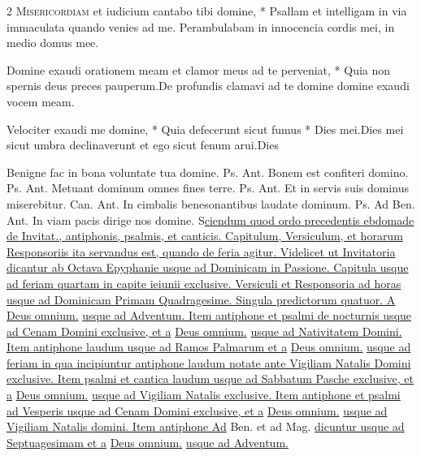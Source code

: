 \begin{multicols*}{2}
\lettrine[lines=2]{\zallmancaps \color{Red} M}{isericordiam} \hypertarget{misericordiam-et-iudicium}{\label{misericordiam-et-iudicium}} et iudicium cantabo tibi domine, * Psallam et intelligam in via immaculata quando venies ad me. \V Perambulabam in innocencia cordis mei, in medio domus mee.
\begin{responsory}
{Domine exaudi orationem meam et clamor meus ad te perveniat, * Quia non spernis deus preces pauperum.}{De profundis clamavi ad te domine domine exaudi vocem meam.}
\end{responsory}%
\begin{responsory-final}
{Velociter exaudi me domine, * Quia defecerunt sicut fumus * Dies mei.}{Dies mei sicut umbra declinaverunt et ego sicut fenum arui.}{Dies}
\end{responsory-final}%
 Benigne fac in bona voluntate tua domine. {\color{Red} Ps.}  {\color{Red} Ant.} Bonem est confiteri domino. {\color{Red} Ps.}  {\color{Red} Ant.} Metuant dominum omnes fines terre. {\color{Red} Ps.}  {\color{Red} Ant.} Et in servis suis dominus miserebitur. {\color{Red} Can.}  {\color{Red} Ant.} In cimbalis benesonantibus laudate dominum. {\color{Red} Ps.}  {\color{Red} Ad Ben. Ant.} In viam pacis dirige nos domine.
\lettrine[lines=2]{\zallmancaps \color{Blue} S}{}\ul{ciendum quod ordo precedentis ebdomade de Invitat., antiphonis, psalmis, et canticis. Capitulum, Versiculum, et horarum Responsoriis ita servandus est, quando de feria agitur. Videlicet ut Invitatoria dicantur ab Octava Epyphanie usque ad Dominicam in Passione. Capitula usque ad feriam quartam in capite ieiunii exclusive. Versiculi et Responsoria ad horas usque ad Dominicam Primam Quadragesime. Singula predictorum quatuor. A} \hyperlink{deus-omnium}{Deus omnium.} \ul{usque ad Adventum. Item antiphone et psalmi de nocturnis usque ad Cenam Domini exclusive, et a} \hyperlink{deus-omnium}{Deus omnium.} \ul{usque ad Nativitatem Domini. Item antiphone laudum usque ad Ramos Palmarum et a} \hyperlink{deus-omnium}{Deus omnium.} \ul{usque ad feriam in qua incipiuntur antiphone laudum notate ante Vigiliam Natalis Domini exclusive. Item psalmi et cantica laudum usque ad Sabbatum Pasche exclusive, et a} \hyperlink{deus-omnium}{Deus omnium.} \ul{usque ad Vigiliam Natalis exclusive. Item antiphone et psalmi ad Vesperis usque ad Cenam Domini exclusive, et a} \hyperlink{deus-omnium}{Deus omnium.} \ul{usque ad Vigiliam Natalis domini. Item antiphone Ad} Ben. et ad Mag. \ul{dicuntur usque ad Septuagesimam et a} \hyperlink{deus-omnium}{Deus omnium.} \ul{usque ad Adventum.}

\end{multicols*}
